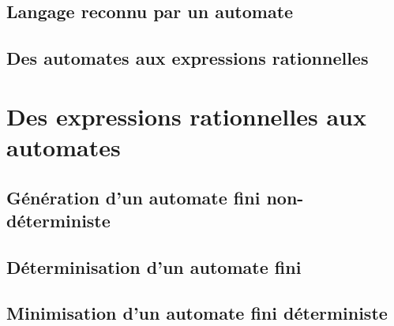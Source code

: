 \subsection{Langage reconnu par un automate}








 
\subsection{Des automates aux expressions rationnelles}






 
\section{Des expressions rationnelles aux automates}
 
\subsection{Génération d'un automate fini non-déterministe}






 
\subsection{Déterminisation d'un automate fini}




 
\subsection{Minimisation d'un automate fini déterministe}








 
